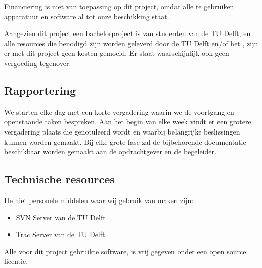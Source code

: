 Financiering is niet van toepassing op dit project, omdat alle te gebruiken apparatuur en software al tot onze beschikking staat.

Aangezien dit project een bachelorproject is van studenten van de TU Delft, en alle resources die benodigd zijn worden geleverd door de TU Delft en/of het \casamproject, zijn er met dit project geen kosten gemoeid. Er staat waarschijnlijk ook geen vergoeding tegenover.

\subsection{Rapportering}

We starten elke dag met een korte vergadering waarin we de voortgang en openstaande taken bespreken. Aan het begin van elke week vindt er een grotere vergadering plaats die genotuleerd wordt en waarbij belangrijke beslissingen kunnen worden gemaakt. Bij elke grote fase zal de bijbehorende documentatie beschikbaar worden gemaakt aan de opdrachtgever en de begeleider.

\subsection{Technische resources}

De niet personele middelen waar wij gebruik van maken zijn:
\begin{itemize}
	\item SVN Server van de TU Delft
	\item Trac Server van de TU Delft
\end{itemize}
Alle voor dit project gebruikte software, is vrij gegeven onder een open source licentie.
